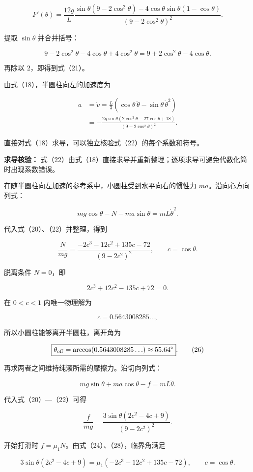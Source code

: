 \documentclass[12pt,a4paper,UTF8]{ctexart}
\begin{document}
\[F'(\theta)=\frac{12g}{L}
\frac{\sin\theta(9-2\cos^2\theta)
-4\cos\theta\sin\theta(1-\cos\theta)}
{(9-2\cos^2\theta)^2}.\]

提取 \(\sin\theta\) 并合并括号：

\[9-2\cos^2\theta-4\cos\theta+4\cos^2\theta
=9+2\cos^2\theta-4\cos\theta.\]

再除以 \(2\)，即得到式（21）。

由式（18），半圆柱向左的加速度为

\[\begin{aligned}
a
&=\dot v
=\frac{L}{3}\left(\cos\theta\,\ddot\theta
-\sin\theta\,\dot\theta^2\right)\\
&=-\frac{2g\sin\theta(2\cos^3\theta-27\cos\theta+18)}
{(9-2\cos^2\theta)^2}.
\end{aligned} \tag{22}\]

直接对式（18）求导，可以独立核验式（22）的每个系数和符号。

\textbf{求导核验：}
式（22）由式（18）直接求导并重新整理；逐项求导可避免代数化简时出现系数错误。

在随半圆柱向左加速的参考系中，小圆柱受到水平向右的惯性力
\(ma\)。沿向心方向列式：

\[mg\cos\theta-N-ma\sin\theta=mL\dot\theta^2. \tag{23}\]

代入式（20）、（22）并整理，得到

\[\frac{N}{mg}
=\frac{-2c^3-12c^2+135c-72}{(9-2c^2)^2},
\qquad c=\cos\theta. \tag{24}\]

脱离条件 \(N=0\)，即

\[2c^3+12c^2-135c+72=0. \tag{25}\]

在 \(0<c<1\) 内唯一物理解为

\[c=0.5643008285\ldots,\]

所以小圆柱能够离开半圆柱，离开角为

\[\boxed{\theta_{\rm off}=\arccos(0.5643008285\ldots)
\approx55.64^\circ}. \tag{26}\]

再求两者之间维持纯滚所需的摩擦力。沿切向列式：

\[mg\sin\theta+ma\cos\theta-f=mL\ddot\theta. \tag{27}\]

代入式（20）---（22）可得

\[\frac{f}{mg}
=\frac{3\sin\theta(2c^2-4c+9)}{(9-2c^2)^2}. \tag{28}\]

开始打滑时 \(f=\mu_1N\)。由式（24）、（28），临界角满足

\[\boxed{
3\sin\theta(2c^2-4c+9)
=\mu_1(-2c^3-12c^2+135c-72),
\qquad c=\cos\theta
}. \tag{29}\]
\end{document}
